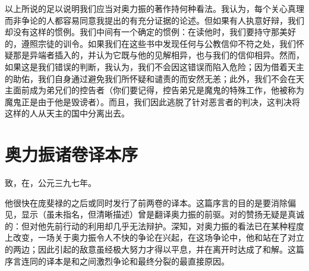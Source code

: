 以上所说的足以说明我们应当对奥力振的著作持何种看法。我认为，每个关心真理而非争论的人都容易同意我提出的有充分证据的论述。但如果有人执意好辩，我们却没有这样的惯例。我们中间有一个确定的惯例：在读他时，我们要持守那美好的，遵照宗徒的训令。如果我们在这些书中发现任何与公教信仰不符之处，我们怀疑那是异端者插入的，并认为它既与他的见解相异，也与我们的信仰相异。然而，如果这是我们错误的判断，我认为，我们不会因这错误而陷入危险；因为借着天主的助佑，我们自身通过避免我们所怀疑和谴责的而安然无恙；此外，我们不会在天主面前成为弟兄们的控告者（你们要记得，控告弟兄是魔鬼的特殊工作，他被称为魔鬼正是由于他是毁谤者）。而且，我们因此逃脱了针对恶言者的判决，这判决将这样的人从天主的国中分离出去。\par


\section{奥力振诸卷译本序}

致，在，公元三九七年。\par

他很快在庞斐禄的之后或同时发行了前两卷的译本。这篇序言的目的是要消除偏见，显示（虽未指名，但清晰描述）曾是翻译奥力振的前驱。对的赞扬无疑是真诚的：但对他先前行动的利用却几乎无法辩护。深知，对奥力振的看法已在某种程度上改变，一场关于奥力振令人不快的争论在兴起，在这场争论中，他和站在了对立的两边；因此引起的敌意虽经极大努力才得以平息，并在离开时达成了和解。这篇序言连同的译本是和之间激烈争论和最终分裂的最直接原因。\par

